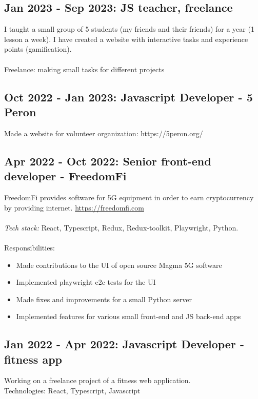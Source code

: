 \documentclass[a4paper, 14pt]{article}
\begin{document}
  \subsection{Jan 2023 - Sep 2023: JS teacher, freelance}
    I taught a small group of 5 students (my friends and their friends) for a year (1 lesson a week). I have created a website with interactive tasks and experience points (gamification). \\
    \\
    Freelance: making small tasks for different projects

  \subsection{Oct 2022 - Jan 2023: Javascript Developer - 5 Peron}
    Made a website for volunteer organization: https://5peron.org/

  \subsection{Apr 2022 - Oct 2022: Senior front-end developer - FreedomFi}

  FreedomFi provides software for 5G equipment in order to earn cryptocurrency by providing internet. \url{https://freedomfi.com} \\
  \\
  \textit{Tech stack:} React, Typescript, Redux, Redux-toolkit, Playwright, Python. \\
  \\
  Responsibilities:
    \begin{itemize}
      \item Made contributions to the UI of open source Magma 5G software \\
      \item Implemented playwright e2e tests for the UI \\
      \item Made fixes and improvements for a small Python server \\
      \item Implemented features for various small front-end and JS back-end apps
    \end{itemize}

  \subsection{Jan 2022 - Apr 2022: Javascript Developer - fitness app}
    Working on a freelance project of a fitness web application. \\
    Technologies: React, Typescript, Javascript
\end{document}
